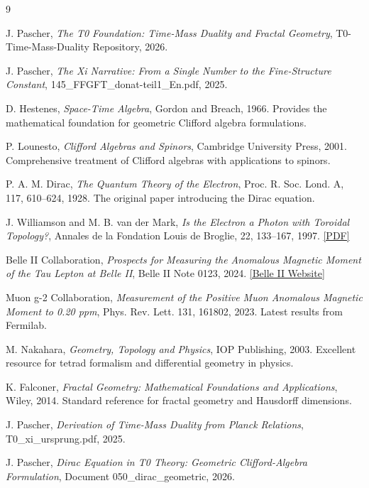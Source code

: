 	\begin{thebibliography}{9}
		
		J. Pascher,
		\textit{The T0 Foundation: Time-Mass Duality and Fractal Geometry},
		T0-Time-Mass-Duality Repository,
		2026.
		
		J. Pascher,
		\textit{The Xi Narrative: From a Single Number to the Fine-Structure Constant},
		145\_FFGFT\_donat-teil1\_En.pdf,
		2025.
		
		D. Hestenes,
		\textit{Space-Time Algebra},
		Gordon and Breach, 1966.
		Provides the mathematical foundation for geometric Clifford algebra formulations.
		
		P. Lounesto,
		\textit{Clifford Algebras and Spinors},
		Cambridge University Press, 2001.
		Comprehensive treatment of Clifford algebras with applications to spinors.
		
		P. A. M. Dirac,
		\textit{The Quantum Theory of the Electron},
		Proc. R. Soc. Lond. A, 117, 610–624, 1928.
		The original paper introducing the Dirac equation.
		
		J. Williamson and M. B. van der Mark,
		\textit{Is the Electron a Photon with Toroidal Topology?},
		Annales de la Fondation Louis de Broglie, 22, 133–167, 1997.
		\href{https://fondationlouisdebroglie.org/IMG/pdf/22_2_133.pdf}{[PDF]}
		
		Belle II Collaboration,
		\textit{Prospects for Measuring the Anomalous Magnetic Moment of the Tau Lepton at Belle II},
		Belle II Note 0123, 2024.
		\href{https://www.belle2.org}{[Belle II Website]}
		
		Muon g-2 Collaboration,
		\textit{Measurement of the Positive Muon Anomalous Magnetic Moment to 0.20 ppm},
		Phys. Rev. Lett. 131, 161802, 2023.
		Latest results from Fermilab.
		
		M. Nakahara,
		\textit{Geometry, Topology and Physics},
		IOP Publishing, 2003.
		Excellent resource for tetrad formalism and differential geometry in physics.
		
		K. Falconer,
		\textit{Fractal Geometry: Mathematical Foundations and Applications},
		Wiley, 2014.
		Standard reference for fractal geometry and Hausdorff dimensions.
		
		J. Pascher,
		\textit{Derivation of Time-Mass Duality from Planck Relations},
		T0\_xi\_ursprung.pdf,
		2025.
		
		J. Pascher,
		\textit{Dirac Equation in T0 Theory: Geometric Clifford-Algebra Formulation},
		Document 050\_dirac\_geometric,
		2026.

	\end{thebibliography}
	
